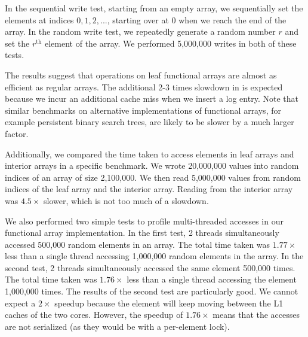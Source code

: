 In the sequential write test, starting from an empty array, we sequentially set the elements at indices $0,1,2,...$, starting over at $0$ when we reach the end of the array. In the random write test, we repeatedly generate a random number $r$ and set the $r^{\text{th}}$ element of the array. We performed 5,000,000 writes in both of these tests.

The results suggest that operations on leaf functional arrays are almost as efficient as regular arrays. The additional 2-3 times slowdown in \set{} is expected because we incur an additional cache miss when we insert a log entry. Note that similar benchmarks on alternative implementations of functional arrays, for example persistent binary search trees, are likely to be slower by a much larger factor.

Additionally, we compared the time taken to access elements in leaf arrays and interior arrays in a specific benchmark. We wrote 20,000,000 values into random indices of an array of size 2,100,000. We then read 5,000,000 values from random indices of the leaf array and the interior array. Reading from the interior array was $4.5 \times$ slower, which is not too much of a slowdown.

We also performed two simple tests to profile multi-threaded accesses in our functional array implementation. In the first test, 2 threads simultaneously accessed 500,000 random elements in an array. The total time taken was $1.77 \times$ less than a single thread accessing 1,000,000 random elements in the array. In the second test, 2 threads simultaneously accessed the same element 500,000 times. The total time taken was $1.76 \times$ less than a single thread accessing the element 1,000,000 times. The results of the second test are particularly good. We cannot expect a $2\times$ speedup because the element will keep moving between the L1 caches of the two cores. However, the speedup of $1.76 \times$ means that the accesses are not serialized (as they would be with a per-element lock).
